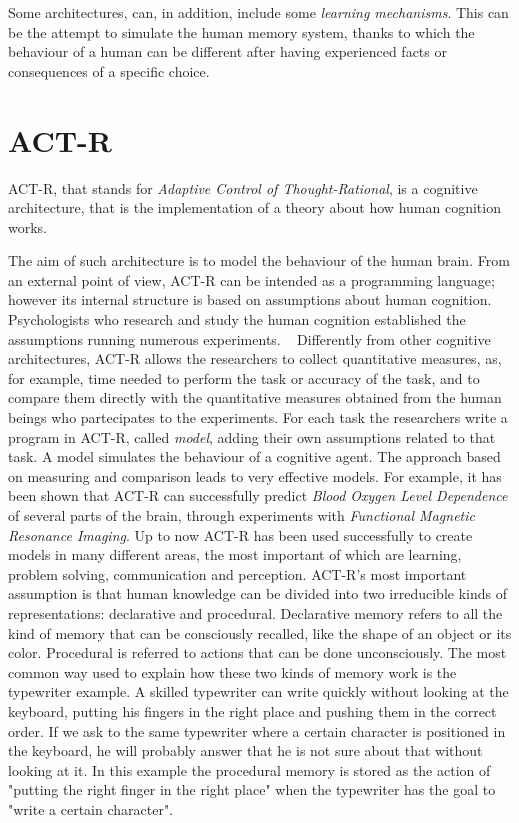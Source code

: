 	Some architectures, can, in addition, include some \emph{learning mechanisms}. This can be the attempt to simulate the human memory system, thanks to which the behaviour of a human can be different after having experienced facts or consequences of a specific choice. ~\cite{Sears2012}
	
	
  \section{ACT-R}
	\mbox{ACT-R}, that stands for \emph{Adaptive Control of Thought-Rational}, is a cognitive architecture, that is the implementation of a theory about how human cognition works.
	
	The aim of such architecture is to model the behaviour of the human brain. From an external point of view, \mbox{ACT-R} can be intended as a programming language; however its internal structure is based on assumptions about human cognition. Psychologists who research and study the human cognition established the assumptions running numerous experiments.  ~\cite{Allen94}
	Differently from other cognitive architectures, \mbox{ACT-R} allows the researchers to collect quantitative measures, as, for example, time needed to perform the task or accuracy of the task, and to compare them directly with the quantitative measures obtained from the human beings who partecipates to the experiments. For each task the researchers write a program in \mbox{ACT-R}, called \emph{model}, adding their own assumptions related to that task. 
	A model simulates the behaviour of a cognitive agent. The approach based on measuring and comparison leads to very effective models. For example, it has been shown that \mbox{ACT-R} can successfully predict \emph{Blood Oxygen Level Dependence} of several parts of the brain, through experiments with \emph{Functional Magnetic Resonance Imaging}.
	Up to now \mbox{ACT-R} has been used successfully to create models in many different areas, the most important of which are learning, problem solving, communication and perception.
\newline
	\mbox{ACT-R's} most important assumption is that human knowledge can be divided into two irreducible kinds of representations: declarative and procedural.
	Declarative memory refers to all the kind of memory that can be consciously recalled, like the shape of an object or its color. Procedural is referred to actions that can be done unconsciously. The most common way used to explain how these two kinds of memory work is the typewriter example. 
	A skilled typewriter can write quickly without looking at the keyboard, putting his fingers in the right place and pushing them in the correct order. If we ask to the same typewriter where a certain character is positioned in the keyboard, he will probably answer that he is not sure about that without looking at it. In this example the procedural memory is stored as the action of "putting the right finger in the right place" when the typewriter has the goal to "write a certain character". 

